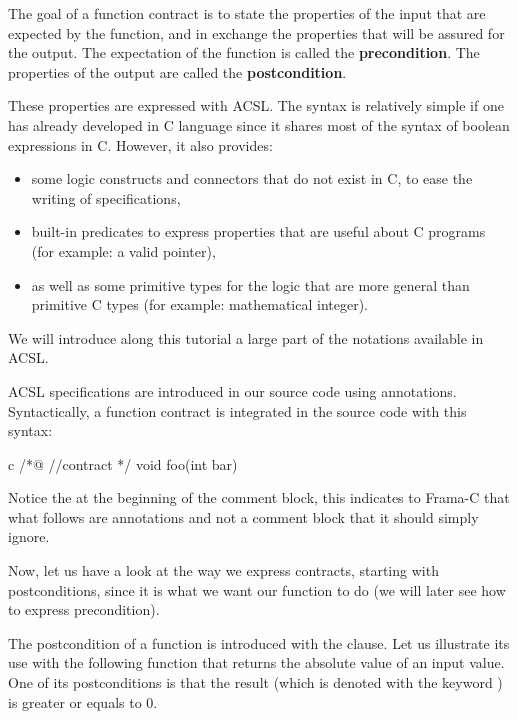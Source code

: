 The goal of a function contract is to state the properties of the input that are
expected by the function, and in exchange the properties that will be assured
for the output. The expectation of the function is called the
\textbf{precondition}. The properties of the output are called the
\textbf{postcondition}.



These properties are expressed with ACSL. The syntax is relatively
simple if one has already developed in C language since it shares most
of the syntax of boolean expressions in C. However, it also provides:
\begin{itemize}
\item
  some logic constructs and connectors that do not exist in C, to ease
  the writing of specifications,
\item
  built-in predicates to express properties that are useful about C
  programs (for example: a valid pointer),
\item
  as well as some primitive types for the logic that are more general
  than primitive C types (for example: mathematical integer).
\end{itemize}



We will introduce along this tutorial a large part of the notations
available in ACSL.



ACSL specifications are introduced in our source code using annotations.
Syntactically, a function contract is integrated in the source code with
this syntax:



\begin{CodeBlock}{c}
/*@
  //contract
*/
void foo(int bar){

}
\end{CodeBlock}



Notice the  at the beginning of the comment block, this
indicates to Frama-C that what follows are annotations and not a comment
block that it should simply ignore.



Now, let us have a look at the way we express contracts, starting with
postconditions, since it is what we want our function to do (we will
later see how to express precondition).





The postcondition of a function is introduced with the  clause.
Let us illustrate its use with the following function
that returns the absolute value of an input value. One of its postconditions
is that the result (which is denoted with the keyword
) is greater or equals to 0.



